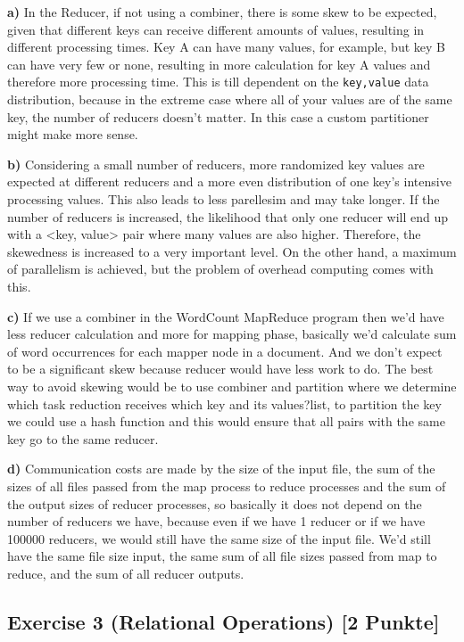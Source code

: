 \documentclass[]{article}
\begin{document}
\textbf{a)} In the Reducer, if not using a combiner, there is some skew
to be expected, given that different keys can receive different amounts
of values, resulting in different processing times. Key A can have many
values, for example, but key B can have very few or none, resulting in
more calculation for key A values and therefore more processing time.
This is till dependent on the \texttt{key,value} data distribution,
because in the extreme case where all of your values are of the same
key, the number of reducers doesn't matter. In this case a custom
partitioner might make more sense.

\textbf{b)} Considering a small number of reducers, more randomized key
values are expected at different reducers and a more even distribution
of one key's intensive processing values. This also leads to less
parellesim and may take longer. If the number of reducers is increased,
the likelihood that only one reducer will end up with a \textless{}key,
value\textgreater{} pair where many values are also higher. Therefore,
the skewedness is increased to a very important level. On the other
hand, a maximum of parallelism is achieved, but the problem of overhead
computing comes with this.

\textbf{c)} If we use a combiner in the WordCount MapReduce program then
we'd have less reducer calculation and more for mapping phase, basically
we'd calculate sum of word occurrences for each mapper node in a
document. And we don't expect to be a significant skew because reducer
would have less work to do. The best way to avoid skewing would be to
use combiner and partition where we determine which task reduction
receives which key and its values?list, to partition the key we could
use a hash function and this would ensure that all pairs with the same
key go to the same reducer.

\textbf{d)} Communication costs are made by the size of the input file,
the sum of the sizes of all files passed from the map process to reduce
processes and the sum of the output sizes of reducer processes, so
basically it does not depend on the number of reducers we have, because
even if we have 1 reducer or if we have 100000 reducers, we would still
have the same size of the input file. We'd still have the same file size
input, the same sum of all file sizes passed from map to reduce, and the
sum of all reducer outputs.

\newpage

\hypertarget{exercise-3-relational-operations-2-punkte}{%
\subsection{Exercise 3 (Relational Operations) {[}2
Punkte{]}}\label{exercise-3-relational-operations-2-punkte}}
\end{document}
